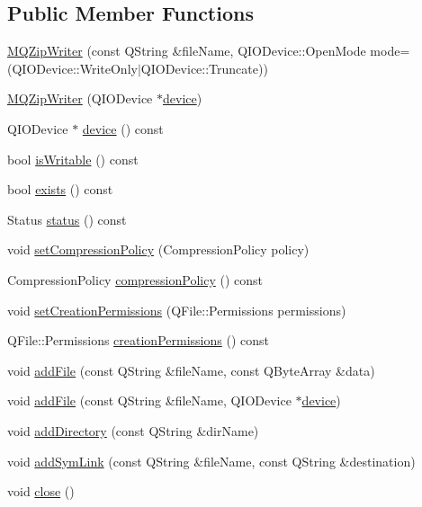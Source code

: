 \subsection*{Public Member Functions}
\begin{DoxyCompactItemize}
\item 
\hyperlink{class_m_q_zip_writer_af533fca464fe2bac29083a27b2356f51}{M\+Q\+Zip\+Writer} (const Q\+String \&file\+Name, Q\+I\+O\+Device\+::\+Open\+Mode mode=(Q\+I\+O\+Device\+::\+Write\+Only$\vert$Q\+I\+O\+Device\+::\+Truncate))
\item 
\hyperlink{class_m_q_zip_writer_a47881309d8438d2face8d740e17f0b4b}{M\+Q\+Zip\+Writer} (Q\+I\+O\+Device $\ast$\hyperlink{class_m_q_zip_writer_ad2c9fc653181defe0f54bebd8e0ac21d}{device})
\item 
Q\+I\+O\+Device $\ast$ \hyperlink{class_m_q_zip_writer_ad2c9fc653181defe0f54bebd8e0ac21d}{device} () const
\item 
bool \hyperlink{class_m_q_zip_writer_a96cf59b1f12b11fcee87f1e4e6c647a9}{is\+Writable} () const
\item 
bool \hyperlink{class_m_q_zip_writer_ac3ed7d79e04aca62ecdb0f7222422ec2}{exists} () const
\item 
Status \hyperlink{class_m_q_zip_writer_a89cf6db4ed393de1791468e6aad7a99e}{status} () const
\item 
void \hyperlink{class_m_q_zip_writer_ab4f5f12ae8df67674ec0f3d30d97313f}{set\+Compression\+Policy} (Compression\+Policy policy)
\item 
Compression\+Policy \hyperlink{class_m_q_zip_writer_aa43250ac355d31da13d5eaa018d50c15}{compression\+Policy} () const
\item 
void \hyperlink{class_m_q_zip_writer_af965ba3d12531a91ca0c83e25423a313}{set\+Creation\+Permissions} (Q\+File\+::\+Permissions permissions)
\item 
Q\+File\+::\+Permissions \hyperlink{class_m_q_zip_writer_a7ee2e99567e134f338093929469ab818}{creation\+Permissions} () const
\item 
void \hyperlink{class_m_q_zip_writer_af6d89acc4efc589f0c90c985106e2b00}{add\+File} (const Q\+String \&file\+Name, const Q\+Byte\+Array \&data)
\item 
void \hyperlink{class_m_q_zip_writer_a4233d3f0452f5c416c8f314e74308344}{add\+File} (const Q\+String \&file\+Name, Q\+I\+O\+Device $\ast$\hyperlink{class_m_q_zip_writer_ad2c9fc653181defe0f54bebd8e0ac21d}{device})
\item 
void \hyperlink{class_m_q_zip_writer_a08703913c70762b5a649bad3be9e1c6c}{add\+Directory} (const Q\+String \&dir\+Name)
\item 
void \hyperlink{class_m_q_zip_writer_a23bd7609856cb06487ab1c4bc0e2e2be}{add\+Sym\+Link} (const Q\+String \&file\+Name, const Q\+String \&destination)
\item 
void \hyperlink{class_m_q_zip_writer_a4553036171792fd6f254b28cc68818f6}{close} ()
\end{DoxyCompactItemize}


